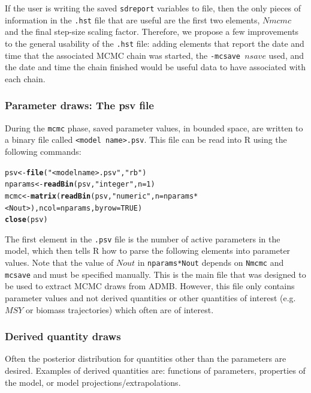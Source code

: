 \documentclass{article}\usepackage[]{graphicx}\usepackage[]{color}
\makeatletter
\newcommand{\hlstr}[1]{\textcolor[rgb]{0.192,0.494,0.8}{#1}}%
\newcommand{\hlkwd}[1]{\textcolor[rgb]{0.737,0.353,0.396}{\textbf{#1}}}%
\newenvironment{kframe}{%
 \def\at@end@of@kframe{}%
 \ifinner\ifhmode%
  \def\at@end@of@kframe{\end{minipage}}%
  \begin{minipage}{\columnwidth}%
 \fi\fi%
 \def\FrameCommand##1{\hskip\@totalleftmargin \hskip-\fboxsep
 \colorbox{shadecolor}{##1}\hskip-\fboxsep
     \hskip-\linewidth \hskip-\@totalleftmargin \hskip\columnwidth}%
 \MakeFramed {\advance\hsize-\width
   \@totalleftmargin\z@ \linewidth\hsize
   \@setminipage}}%
 {\par\unskip\endMakeFramed%
 \at@end@of@kframe}
\newenvironment{knitrout}{}{} %
\makeatother
\begin{document}
If the user is writing the saved \texttt{sdreport} variables to file, then the only 
pieces of information in the \texttt{.hst} file that are useful are the first two 
elements, $Nmcmc$ and the final step-size scaling factor. Therefore, we propose a few 
improvements to the general usability of the \texttt{.hst} file: adding elements that 
report the date and time that the associated MCMC chain was started, the 
\texttt{-mcsave $nsave$} used, and the date and time the chain finished would be useful 
data to have associated with each chain.

\subsubsection{Parameter draws: The psv file}
During the \texttt{mcmc} phase, saved parameter values, in
bounded space, are written to a binary file called
\texttt{<model name>.psv}. This file can be read into R
using the following commands:
\begin{knitrout}
\color{fgcolor}\begin{kframe}
\begin{alltt}
psv <- \hlkwd{file}(\hlstr{"<model name>.psv"}, \hlstr{"rb"})
nparams <- \hlkwd{readBin}(psv, \hlstr{"integer"}, n=1)
mcmc <- \hlkwd{matrix}(\hlkwd{readBin}(psv, \hlstr{"numeric"}, n=nparams*<Nout>), ncol=nparams, byrow=TRUE)
\hlkwd{close}(psv)
\end{alltt}
\end{kframe}
\end{knitrout}

The first element in the \texttt{.psv} file is the number of
active parameters in the model, which then tells R how to
parse the following elements into parameter values. Note
that the value of $Nout$ in \texttt{nparams*Nout} depends on
\texttt{Nmcmc} and \texttt{mcsave} and must be specified
manually. This is the main file that was designed to be used
to extract MCMC draws from ADMB. However, this file only
contains parameter values and not derived quantities or
other quantities of interest (e.g. $MSY$ or biomass
trajectories) which often are of interest.
\subsubsection{Derived quantity draws}
Often the posterior distribution for quantities other than
the parameters are desired. Examples of derived quantities
are: functions of parameters, properties of the model, or
model projections/extrapolations.
\end{document}
